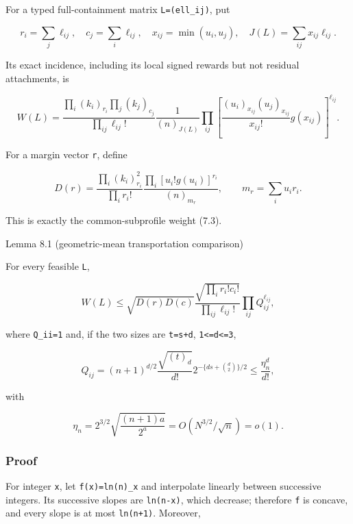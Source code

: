 \documentclass[
  11pt,
  a4paper,
]{article}
\begin{document}
For a typed full-containment matrix \texttt{L=(ell\_ij)}, put

\[
 r_i=\sum_j\ell_{ij},\quad c_j=\sum_i\ell_{ij},\quad
 x_{ij}=\min(u_i,u_j),\quad J(L)=\sum_{ij}x_{ij}\ell_{ij}. \tag{8.5}
\]

Its exact incidence, including its local signed rewards but not residual
attachments, is

\[
 W(L)=
 \frac{\prod_i(k_i)_{r_i}\prod_j(k_j)_{c_j}}
      {\prod_{ij}\ell_{ij}!}\frac1{(n)_{J(L)}}
 \prod_{ij}\left[
  \frac{(u_i)_{x_{ij}}(u_j)_{x_{ij}}}{x_{ij}!}g(x_{ij})
 \right]^{\ell_{ij}}.                                   \tag{8.6}
\]

For a margin vector \texttt{r}, define

\[
 D(r)=
 \frac{\prod_i(k_i)_{r_i}^2}{\prod_i r_i!}
 \frac{\prod_i[u_i!g(u_i)]^{r_i}}{(n)_{m_r}},\qquad
 m_r=\sum_i u_ir_i.                                     \tag{8.7}
\]

This is exactly the common-subprofile weight (7.3).

{}
\label{lemma-8.1-geometric-mean-transportation-comparison}
\begin{lemmabox}{Lemma 8.1 (geometric-mean transportation comparison)}

For every feasible \texttt{L},

\[
 W(L)\le\sqrt{D(r)D(c)}
 \frac{\sqrt{\prod_i r_i!c_i!}}{\prod_{ij}\ell_{ij}!}
 \prod_{ij}Q_{ij}^{\ell_{ij}},                          \tag{8.8}
\]

where \texttt{Q\_ii=1} and, if the two sizes are \texttt{t=s+d},
\texttt{1\textless{}=d\textless{}=3},

\[
 Q_{ij}=(n+1)^{d/2}\frac{\sqrt{(t)_d}}{d!}
       2^{-\{ds+\binom d2\}/2}
 \le\frac{\eta_n^d}{d!},                               \tag{8.9}
\]

with

\[
 \eta_n=2^{3/2}\sqrt{\frac{(n+1)a}{2^a}}
       =O(N^{3/2}/\sqrt n)=o(1).                         \tag{8.10}
\]

\end{lemmabox}

\subsubsection{Proof}\label{proof-5}

For integer \texttt{x}, let \texttt{f(x)=ln(n)\_x} and interpolate
linearly between successive integers. Its successive slopes are
\texttt{ln(n-x)}, which decrease; therefore \texttt{f} is concave, and
every slope is at most \texttt{ln(n+1)}. Moreover,
\end{document}
